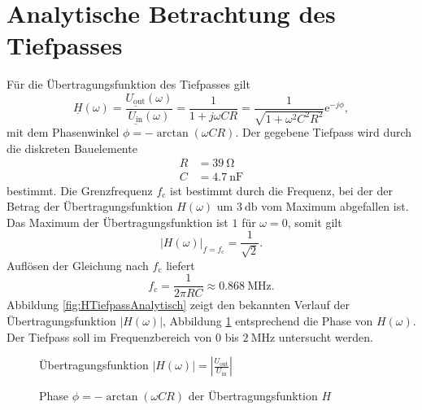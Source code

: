 \documentclass[12pt,report,final,twoside,accentcolor=tud9b,bigchapter]{tudreport}
\newcommand{\Uin}{U_\textrm{in}}
\newcommand{\Uout}{U_\textrm{out}}
\begin{document}
\section{Analytische Betrachtung des Tiefpasses}
Für die Übertragungsfunktion des Tiefpasses gilt
\begin{equation}
\underline{H}(\omega)=\frac{\underline{\Uout}(\omega)}{\underline{\Uin}(\omega)}=\frac{1}{1+j\omega CR}=\frac{1}{\sqrt{1+\omega^2C^2R^2}}\mathrm{e}^{-j\phi},
\end{equation}
mit dem Phasenwinkel $\phi=-\arctan(\omega CR)$. Der gegebene Tiefpass wird durch die diskreten Bauelemente
\begin{align}
R &= \SI{39}{\ohm} \\
C &= \SI{4.7}{\nano\farad}
\end{align}
bestimmt. Die Grenzfrequenz $f_\textrm{c}$ ist bestimmt durch die Frequenz, bei der der Betrag der Übertragungsfunktion $H(\omega)$ um $\SI{3}{\decibel}$ vom Maximum abgefallen ist. Das Maximum der Übertragungsfunktion ist $1$ für $\omega=0$, somit gilt 
\begin{equation}
\left|H(\omega)\right|_{f=f_\textrm{c}}=\frac{1}{\sqrt{2}}.
\end{equation}
Auflösen der Gleichung nach $f_\textrm{c}$ liefert
\begin{equation}
f_\textrm{c}=\frac{1}{2 \pi RC} \approx \SI{0.868}{\mega\hertz}.
\end{equation}
Abbildung \ref{fig:HTiefpassAnalytisch} zeigt den bekannten Verlauf der Übertragungsfunktion $|H(\omega)|$, Abbildung \ref{fig:PhaseTiefpassAnalytisch} entsprechend die Phase von $H(\omega)$. Der Tiefpass soll im Frequenzbereich von $0$ bis $\SI{2}{\mega\hertz}$ untersucht werden.
\begin{figure}[t!] 
\begin{minipage}[t]{0.48\linewidth}     
  \centering
{}
  \caption{Übertragungsfunktion \mbox{$|H(\omega)|=\left|\frac{\Uout}{\Uin}\right|$}}
  \label{fig:HTiefpassAnalytisch}
\end{minipage}
  \hfill
\begin{minipage}[t]{0.48\linewidth}     
  \centering
{}
  \caption{Phase $\phi=-\arctan(\omega CR)$ der Übertragungsfunktion $H$}
  \label{fig:PhaseTiefpassAnalytisch}
\end{minipage}
\end{figure}
\end{document}
